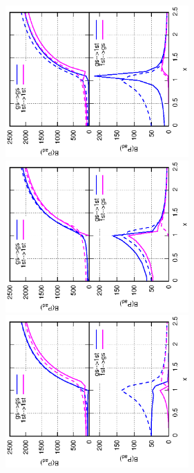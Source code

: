 \documentclass[%
superscriptaddress,
preprint,
showpacs,
nofootinbib,
amsmath,amssymb,
aps,
prc,
floatfix ]%
{revtex4-1}
\begin{document}
\begin{figure}[htbp]
 \begin{minipage}{0.3\hsize}
 \begin{center}
  \includegraphics[width=70mm,angle=-90]{images/N100Pad_CQ.eps}
 \end{center}
 \captionsetup{labelformat=empty,labelsep=none}
 \end{minipage}
 \begin{minipage}{0.3\hsize}
 \begin{center}
  \includegraphics[width=70mm,angle=-90]{images/N100Pad_FD.eps}
 \end{center}
 \captionsetup{labelformat=empty,labelsep=none}
 \end{minipage}
 \begin{minipage}{0.3\hsize}
 \begin{center}
  \includegraphics[width=70mm,angle=-90]{images/N100Pad_SPA.eps}

\end{center}
\end{minipage}
\end{figure}
\end{document}
